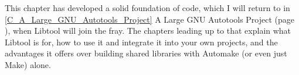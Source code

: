 This chapter has developed a solid foundation of code, which I will return to 
in \ref{C_A_Large_GNU_Autotools_Project} A Large GNU Autotools Project (page
\pageref{C_A_Large_GNU_Autotools_Project}), when Libtool will join the fray.
The chapters leading up to that explain what Libtool is for, how to use it 
and integrate it into your own projects, and the advantages it offers over 
building shared libraries with Automake (or even just Make) alone.

